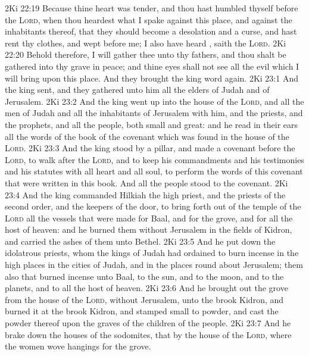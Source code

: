 \vs 2Ki 22:19 Because thine heart was tender, and thou hast humbled thyself before the \textsc{Lord}, when thou heardest what I spake against this place, and against the inhabitants thereof, that they should become a desolation and a curse, and hast rent thy clothes, and wept before me; I also have heard , saith the \textsc{Lord}.
\vs 2Ki 22:20 Behold therefore, I will gather thee unto thy fathers, and thou shalt be gathered into thy grave in peace; and thine eyes shall not see all the evil which I will bring upon this place. And they brought the king word again.
\vs 2Ki 23:1 And the king sent, and they gathered unto him all the elders of Judah and of Jerusalem.
\vs 2Ki 23:2 And the king went up into the house of the \textsc{Lord}, and all the men of Judah and all the inhabitants of Jerusalem with him, and the priests, and the prophets, and all the people, both small and great: and he read in their ears all the words of the book of the covenant which was found in the house of the \textsc{Lord}.
\vs 2Ki 23:3 And the king stood by a pillar, and made a covenant before the \textsc{Lord}, to walk after the \textsc{Lord}, and to keep his commandments and his testimonies and his statutes with all  heart and all  soul, to perform the words of this covenant that were written in this book. And all the people stood to the covenant.
\vs 2Ki 23:4 And the king commanded Hilkiah the high priest, and the priests of the second order, and the keepers of the door, to bring forth out of the temple of the \textsc{Lord} all the vessels that were made for Baal, and for the grove, and for all the host of heaven: and he burned them without Jerusalem in the fields of Kidron, and carried the ashes of them unto Bethel.
\vs 2Ki 23:5 And he put down the idolatrous priests, whom the kings of Judah had ordained to burn incense in the high places in the cities of Judah, and in the places round about Jerusalem; them also that burned incense unto Baal, to the sun, and to the moon, and to the planets, and to all the host of heaven.
\vs 2Ki 23:6 And he brought out the grove from the house of the \textsc{Lord}, without Jerusalem, unto the brook Kidron, and burned it at the brook Kidron, and stamped  small to powder, and cast the powder thereof upon the graves of the children of the people.
\vs 2Ki 23:7 And he brake down the houses of the sodomites, that  by the house of the \textsc{Lord}, where the women wove hangings for the grove.

